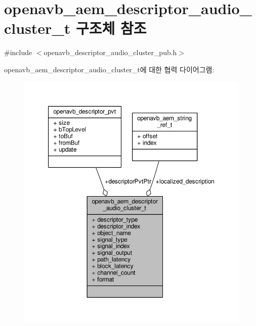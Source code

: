 \hypertarget{structopenavb__aem__descriptor__audio__cluster__t}{}\section{openavb\+\_\+aem\+\_\+descriptor\+\_\+audio\+\_\+cluster\+\_\+t 구조체 참조}
\label{structopenavb__aem__descriptor__audio__cluster__t}


{\ttfamily \#include $<$openavb\+\_\+descriptor\+\_\+audio\+\_\+cluster\+\_\+pub.\+h$>$}



openavb\+\_\+aem\+\_\+descriptor\+\_\+audio\+\_\+cluster\+\_\+t에 대한 협력 다이어그램\+:
\nopagebreak
\begin{figure}[H]
\begin{center}
\leavevmode
\includegraphics[width=350pt]{structopenavb__aem__descriptor__audio__cluster__t__coll__graph}
\end{center}
\end{figure}
